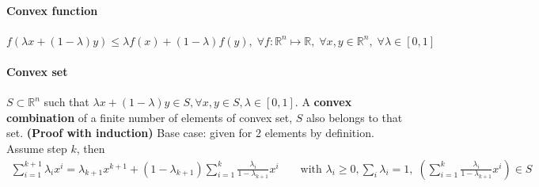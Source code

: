 \documentclass{article}
\begin{document}

\paragraph{Convex function} $ f(\lambda x + (1 - \lambda)y)\leq \lambda f(x) + (1-\lambda)f(y), \; \forall f:\mathbb R^n  \mapsto \mathbb R,\; \forall x,y \in \mathbb R^n,\; \forall \lambda \in [0, 1]$


\paragraph{Convex set} $S \subset \mathbb R^n$ such that $\lambda x + (1 - \lambda)y \in S, \forall x,y \in S, \lambda \in [0,1]$. A \textbf{convex combination} of a finite number of elements of convex set, $S$ also belongs to that set. \textbf{(Proof with induction)} Base case: given for 2 elements by definition. Assume step $k$, then
\begin{align*}
    \sum_{i=1}^{k+1}\lambda_i x^i = \lambda_{k+1}x^{k+1} + (1 - \lambda_{k+1})\sum_{i=1}^k \frac{\lambda_i}{1 - \lambda_{k+1}}x^i && \text{ with }\lambda_i \geq 0, \sum_i\lambda_i = 1,\; \left(\sum_{i=1}^k \frac{\lambda_i}{1 - \lambda_{k+1}}x^i\right) \in S
\end{align*}
\end{document}
